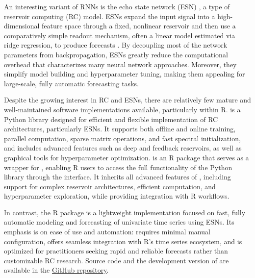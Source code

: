 An interesting variant of RNNs is the echo state network (ESN) \citep{Jaeger2001}, a type of reservoir computing (RC) model. ESNs expand the input signal into a high-dimensional feature space through a fixed, nonlinear reservoir and then use a comparatively simple readout mechanism, often a linear model estimated via ridge regression, to produce forecasts \citep{Lukosevicius2009, Lukosevicius2012}. By decoupling most of the network parameters from backpropagation, ESNs greatly reduce the computational overhead that characterizes many neural network approaches. Moreover, they simplify model building and hyperparameter tuning, making them appealing for large-scale, fully automatic forecasting tasks.

Despite the growing interest in RC and ESNs, there are relatively few mature and well-maintained software implementations available, particularly within R.  \citep{ReservoirPy} is a Python library designed for efficient and flexible implementation of RC architectures, particularly ESNs. It supports both offline and online training, parallel computation, sparse matrix operations, and fast spectral initialization, and includes advanced features such as deep and feedback reservoirs, as well as graphical tools for hyperparameter optimization.  is an R package that serves as a wrapper for , enabling R users to access the full functionality of the Python library through the  \citep{reticulate} interface. It inherits all advanced features of , including support for complex reservoir architectures, efficient computation, and hyperparameter exploration, while providing integration with R workflows.

In contrast, the R package  \citep{echos} is a lightweight implementation focused on fast, fully automatic modeling and forecasting of univariate time series using ESNs. Its emphasis is on ease of use and automation:  requires minimal manual configuration, offers seamless integration with R's time series ecosystem, and is optimized for practitioners seeking rapid and reliable forecasts rather than customizable RC research. Source code and the development version of  are available in the \href{https://github.com/ahaeusser/echos}{GitHub repository}.

